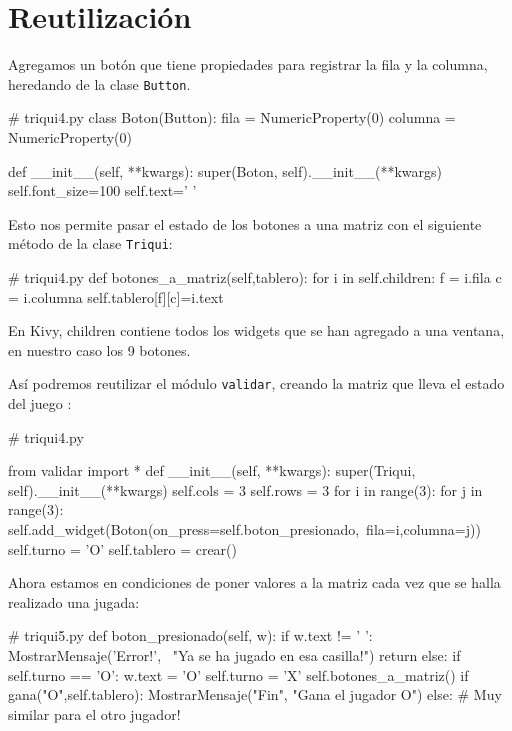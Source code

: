 \section{Reutilización}


Agregamos un botón que tiene propiedades para registrar la fila y
la columna, heredando de la clase \texttt{Button}.

\begin{pythoncode}
# triqui4.py
class Boton(Button):
    fila = NumericProperty(0)
    columna = NumericProperty(0)
    
    def __init__(self, **kwargs):      
        super(Boton, self).__init__(**kwargs)
        self.font_size=100
        self.text=' '
\end{pythoncode}

Esto nos permite pasar el estado de los botones a una matriz con el
siguiente método de la clase \texttt{Triqui}:

\begin{pythoncode}
# triqui4.py
    def botones_a_matriz(self,tablero):
        for i in self.children:
            f = i.fila
            c = i.columna
            self.tablero[f][c]=i.text
\end{pythoncode}

En Kivy, children contiene todos los widgets que se han agregado a
una ventana, en nuestro caso los 9 botones.

Así podremos reutilizar el módulo \texttt{validar}, creando la matriz
que lleva el estado del juego :

\begin{pythoncode}
# triqui4.py

from validar import *
    def __init__(self, **kwargs):
        super(Triqui, self).__init__(**kwargs)
        self.cols = 3
        self.rows = 3
        for i in range(3):
            for j in range(3):
                self.add_widget(Boton(on_press=self.boton_presionado,\
                       fila=i,columna=j))
        self.turno = 'O'
        self.tablero = crear()
\end{pythoncode}

Ahora estamos en condiciones de poner valores a la matriz cada vez
que se halla realizado una jugada:

\begin{pythoncode}
# triqui5.py
    def boton_presionado(self, w):
        if w.text != ' ':
            MostrarMensaje('Error!', \
                  "Ya se ha jugado en esa casilla!")
            return
        else:
            if self.turno == 'O':
                w.text =  'O'                
                self.turno = 'X'
                self.botones_a_matriz()
                if gana("O",self.tablero):
                    MostrarMensaje("Fin", "Gana el jugador O")
            else:
                # Muy similar para el otro jugador!
\end{pythoncode}

